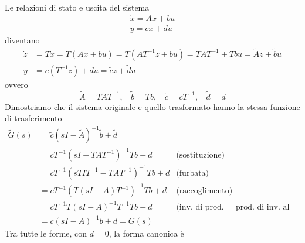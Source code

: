 \documentclass[10pt,a4paper]{book}
\begin{document}
Le relazioni di stato e uscita del sistema
\begin{gather*}
	\dot{x} =Ax+bu\\
	y=cx+du
\end{gather*}
diventano
\begin{equation*}
	\begin{aligned}
		\dot{z} & =T\dot{x} =T\left(Ax+bu\right) =T\left(AT^{-1} z+bu\right) =TAT^{-1} +Tbu=\tilde{A} z+\tilde{b} u \\
		y       & =c\left(T^{-1} z\right) +du=\tilde{c} z+\tilde{d} u                                                
	\end{aligned}
\end{equation*}
ovvero
\begin{equation*}
	\boxed{\tilde{A} =TAT^{-1} ,\ \ \ \ \tilde{b} =Tb,\ \ \ \ \tilde{c} =cT^{-1} ,\ \ \ \ \tilde{d} =d}
\end{equation*}
Dimostriamo che il sistema originale e quello trasformato hanno la stessa funzione di trasferimento
\begin{equation*}
	\begin{aligned}
		\tilde{G}(s) & =\tilde{c}\left(sI-\tilde{A}\right)^{-1}\tilde{b} +\tilde{d} &                                                  \\
		             & =cT^{-1}\left(sI-TAT^{-1}\right)^{-1} Tb+d                   & \text{(sostituzione)}                            \\
		             & =cT^{-1}\left(s T I T^{-1} -TAT^{-1}\right)^{-1} Tb+d        & \text{(furbata)}                                 \\
		             & =cT^{-1}\left(T(sI-A) T^{-1}\right)^{-1} Tb+d               & \text{(raccoglimento)}                           \\
		             & =cT^{-1} T(sI-A)^{-1} T^{-1} Tb+d                            & \text{(inv. di prod. = prod. di inv. al contr.)} \\
		             & =c(sI-A)^{-1} b+d=G(s)                                       &                                                  
	\end{aligned}
\end{equation*}
Tra tutte le forme, con $d=0$, la forma canonica è
\end{document}
